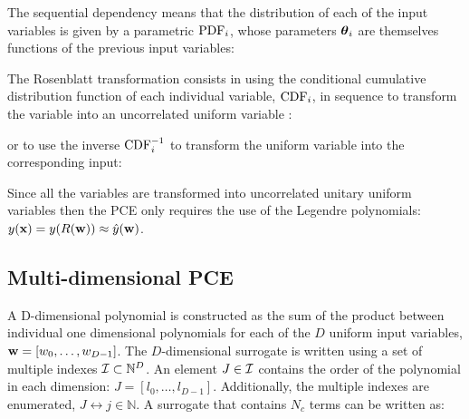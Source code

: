 \documentclass[preprint,12pt]{elsarticle}
\begin{document}
The sequential dependency means that the distribution of each of the input variables is given by a parametric $\mathrm{PDF}_i$, whose parameters $\boldsymbol{\theta}_i$ are themselves functions of the previous input variables:


The Rosenblatt transformation consists in using the conditional cumulative distribution function of each individual variable, $\mathrm{CDF}_i$, in sequence to transform the variable into an uncorrelated uniform variable \cite{rosenblatt1952}:


\noindent or to use the inverse $\mathrm{CDF}^{-1}_i$ to transform the uniform variable into the corresponding input:


Since all the variables are transformed into uncorrelated unitary uniform variables then the PCE only requires the use of the Legendre polynomials: $y(\mathbf{x}) = y(R(\mathbf{w})) \approx \hat{y}(\mathbf{w})$. 





\subsection{Multi-dimensional PCE}

A D-dimensional polynomial is constructed as the sum of the product between individual one dimensional polynomials for each of the $D$ uniform input variables, $\mathbf{w}=[w_0,\dots,w_{D-1}]$. The $D$-dimensional surrogate is written using a set of multiple indexes $\mathcal{I} \subset \mathbb{N}^D$. An element $J\in \mathcal{I}$ contains the order of the polynomial in each dimension: $J = [l_0, \dots, l_{D-1}]$. Additionally, the multiple indexes are enumerated, $J \leftrightarrow j \in \mathbb{N}$. A surrogate that contains $N_c$ terms can be written as:
\end{document}
